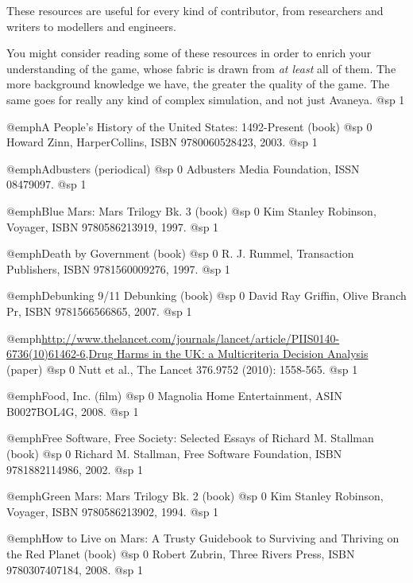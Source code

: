 These resources are useful for every kind of contributor, from researchers and writers to modellers and engineers.

You might consider reading some of these resources in order to enrich your understanding of the game, whose fabric is drawn from {\it at least} all of them. The more background knowledge we have, the greater the quality of the game. The same goes for really any kind of complex simulation, and not just Avaneya.
@sp 1

\itemize

\item
@emph{A People's History of the United States: 1492-Present} (book)
@sp 0
Howard Zinn, HarperCollins, ISBN 9780060528423, 2003.
@sp 1

\item
@emph{Adbusters} (periodical)
@sp 0
Adbusters Media Foundation, ISSN 08479097.
@sp 1

\item
@emph{Blue Mars: Mars Trilogy Bk. 3} (book)
@sp 0
Kim Stanley Robinson, Voyager, ISBN 9780586213919, 1997.
@sp 1

\item
@emph{Death by Government} (book)
@sp 0
R. J. Rummel, Transaction Publishers, ISBN 9781560009276, 1997.
@sp 1

\item
@emph{Debunking 9/11 Debunking} (book)
@sp 0
David Ray Griffin, Olive Branch Pr, ISBN 9781566566865, 2007.
@sp 1

\item
@emph{\url{http://www.thelancet.com/journals/lancet/article/PIIS0140-6736(10)61462-6,Drug Harms in the UK: a Multicriteria Decision Analysis}} (paper)
@sp 0
Nutt et al., The Lancet 376.9752 (2010): 1558-565.
@sp 1

\item
@emph{Food, Inc.} (film)
@sp 0
Magnolia Home Entertainment, ASIN B0027BOL4G, 2008.
@sp 1

\item
@emph{Free Software, Free Society: Selected Essays of Richard M. Stallman} (book)
@sp 0
Richard M. Stallman, Free Software Foundation, ISBN 9781882114986, 2002.
@sp 1

\item
@emph{Green Mars: Mars Trilogy Bk. 2} (book)
@sp 0
Kim Stanley Robinson, Voyager, ISBN 9780586213902, 1994.
@sp 1

\item
@emph{How to Live on Mars: A Trusty Guidebook to Surviving and Thriving on the Red Planet} (book)
@sp 0
Robert Zubrin, Three Rivers Press, ISBN 9780307407184, 2008.
@sp 1


